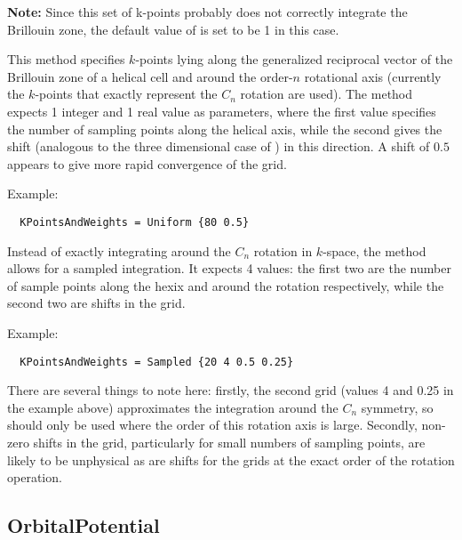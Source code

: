 \textbf{Note:} Since this set of k-points probably does not correctly integrate the Brillouin zone,
the default value of  is set to be 1 in this case.


This method specifies $k$-points lying along the generalized reciprocal vector
of the Brillouin zone of a helical cell and around the order-$n$ rotational axis
(currently the $k$-points that exactly represent the $C_n$ rotation are
used). The  method expects 1 integer and 1 real value as
parameters, where the first value specifies the number of sampling points along
the helical axis, while the second gives the shift (analogous to the three
dimensional case of ) in this direction. A shift of $0.5$
appears to give more rapid convergence of the grid.

Example:
\invparskip
\begin{verbatim}
  KPointsAndWeights = Uniform {80 0.5}
\end{verbatim}


Instead of exactly integrating around the $C_n$ rotation in $k$-space, the
 method allows for a sampled integration. It expects 4 values: the
first two are the number of sample points along the hexix and around the
rotation respectively, while the second two are shifts in the grid.

Example:
\invparskip
\begin{verbatim}
  KPointsAndWeights = Sampled {20 4 0.5 0.25}
\end{verbatim}

There are several things to note here: firstly, the second grid (values 4 and
0.25 in the example above) approximates the integration around the $C_n$
symmetry, so should only be used where the order of this rotation axis is
large. Secondly, non-zero shifts in the grid, particularly for small numbers of
sampling points, are likely to be unphysical as are shifts for the grids at the
exact order of the rotation operation.

\subsection{OrbitalPotential}
\label{sec:dftbp.OrbitalPotential}

\label{sec:DFTB+U}

